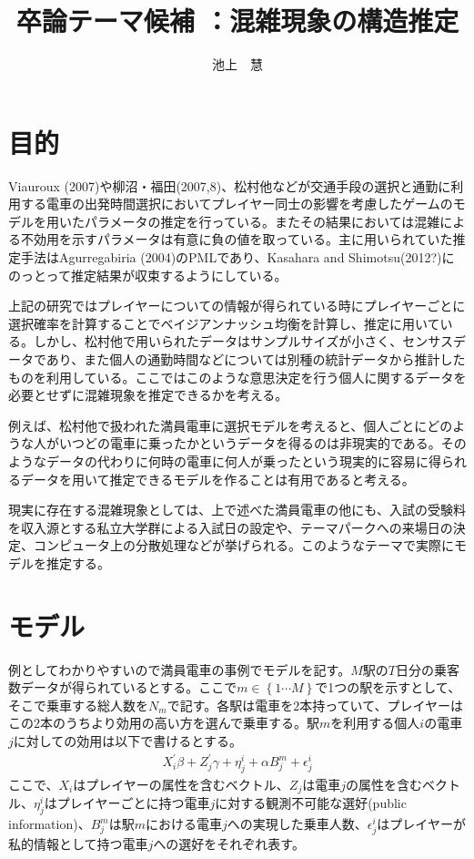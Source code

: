 \documentclass{jsarticle}
\begin{document}
\title{卒論テーマ候補 ：混雑現象の構造推定}
\author{池上　慧}
\maketitle

\section{目的}
Viauroux (2007)や柳沼・福田(2007,8)、松村他などが交通手段の選択と通勤に利用する電車の出発時間選択においてプレイヤー同士の影響を考慮したゲームのモデルを用いたパラメータの推定を行っている。またその結果においては混雑による不効用を示すパラメータは有意に負の値を取っている。主に用いられていた推定手法はAgurregabiria (2004)のPMLであり、Kasahara and Shimotsu(2012?)にのっとって推定結果が収束するようにしている。

上記の研究ではプレイヤーについての情報が得られている時にプレイヤーごとに選択確率を計算することでベイジアンナッシュ均衡を計算し、推定に用いている。しかし、松村他で用いられたデータはサンプルサイズが小さく、センサスデータであり、また個人の通勤時間などについては別種の統計データから推計したものを利用している。ここではこのような意思決定を行う個人に関するデータを必要とせずに混雑現象を推定できるかを考える。

例えば、松村他で扱われた満員電車に選択モデルを考えると、個人ごとにどのような人がいつどの電車に乗ったかというデータを得るのは非現実的である。そのようなデータの代わりに何時の電車に何人が乗ったという現実的に容易に得られるデータを用いて推定できるモデルを作ることは有用であると考える。

現実に存在する混雑現象としては、上で述べた満員電車の他にも、入試の受験料を収入源とする私立大学群による入試日の設定や、テーマパークへの来場日の決定、コンピュータ上の分散処理などが挙げられる。このようなテーマで実際にモデルを推定する。

\section{モデル}
例としてわかりやすいので満員電車の事例でモデルを記す。$M$駅の$T$日分の乗客数データが得られているとする。ここで$m \in \left\{1\cdots M \right\}$で1つの駅を示すとして、そこで乗車する総人数を$N_m$で記す。各駅は電車を$2$本持っていて、プレイヤーはこの$2$本のうちより効用の高い方を選んで乗車する。駅$m$を利用する個人$i$の電車$j$に対しての効用は以下で書けるとする。
\begin{align*}
	X_i^{'}\beta + Z_j^{'}\gamma + \eta_j^i + \alpha B_j^m + \epsilon_j^i
\end{align*}
ここで、$X_i$はプレイヤーの属性を含むベクトル、$Z_j$は電車$j$の属性を含むベクトル、$\eta_j^i$はプレイヤーごとに持つ電車$j$に対する観測不可能な選好(public information)、$B_j^m$は駅$m$における電車$j$への実現した乗車人数、$\epsilon_j^i$はプレイヤーが私的情報として持つ電車$j$への選好をそれぞれ表す。
\end{document}
